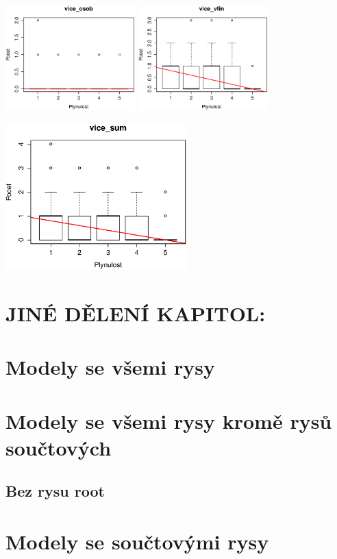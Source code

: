 \documentclass[12pt,a4paper]{report}
\begin{document}
\includegraphics[width=50mm]{./grafy/rysy/vice_osob.eps}
\includegraphics[width=50mm]{./grafy/rysy/vice_vfin.eps}

\includegraphics[width=70mm]{./grafy/rysy/vice_sum.eps}

\section{JINÉ DĚLENÍ KAPITOL:}
\section{Modely se všemi rysy}
\section{Modely se všemi rysy kromě rysů součtových}
\subsection{Bez rysu root}
\section{Modely se součtovými rysy}
\end{document}
